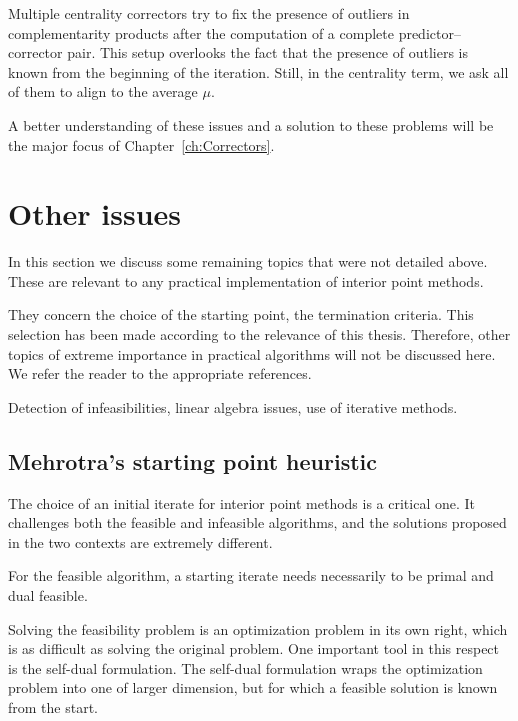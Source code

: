 Multiple centrality correctors try to fix the presence of outliers in 
complementarity products after the computation of a complete 
predictor--corrector pair. This setup overlooks the fact that the 
presence of outliers is known from the beginning of the iteration. 
Still, in the centrality term,  we ask all of them to align to the 
average $\mu$.

A better understanding of these issues and a solution to these
problems will be the major focus of Chapter~\ref{ch:Correctors}.

%
%
\section{Other issues}

In this section we discuss some remaining topics that were not
detailed above. These are relevant to any practical implementation
of interior point methods.

They concern the choice of the starting point, the termination
criteria. This selection has been made according to the relevance
of this thesis.
Therefore, other topics of extreme importance in practical algorithms
will not be discussed here. We refer the reader to the appropriate
references.

Detection of infeasibilities, linear algebra issues, use of iterative
methods.

%
%
\subsection{Mehrotra's starting point heuristic}

The choice of an initial iterate for interior point methods is a
critical one. It challenges both the feasible and infeasible
algorithms, and the solutions proposed in the two contexts are
extremely different.

For the feasible algorithm, a starting iterate needs necessarily 
to be primal and dual feasible.

Solving the feasibility problem is an optimization problem in its
own right, which is as difficult as solving the original problem.
One important tool in this respect is the self-dual formulation.
The self-dual formulation wraps the optimization problem into one 
of larger dimension, but for which a feasible solution is known 
from the start.


